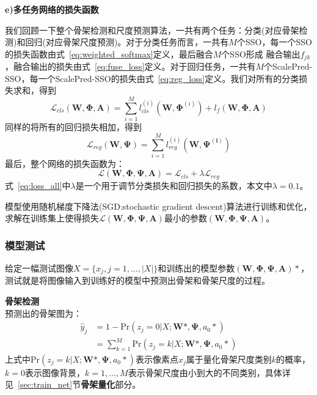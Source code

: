 \documentclass[UTF8]{ctexart}
\numberwithin{equation}{section} %
\numberwithin{table}{section} %
\begin{document}
\vspace{1em}
\noindent \textbf{e)多任务网络的损失函数}

我们回顾一下整个骨架检测和尺度预测算法，一共有两个任务：分类(对应骨架检测)和回归(对应骨架尺度预测)。对于分类任务而言，一共有$M$个SSO，每一个SSO的损失函数由式~\ref{eq:weighted_softmax}定义，最后融合$M$个SSO形成
融合输出$f_{jk}$，融合输出的损失由式~\ref{eq:fuse_loss}定义。对于回归任务，一共有$M$个ScalePred-SSO，每一个ScalePred-SSO的损失由式~\ref{eq:reg_loss}定义。我们对所有的分类损失求和，得到
\begin{equation}
\mathcal{L}_{cls}(\mathbf{W},\mathbf{\Phi},\mathbf{A}) = \sum_{i=1}^M l^{(i)}_{cls}(\mathbf{W}, \mathbf{\Phi}^{(i)})+l_{f}(\mathbf{W},\mathbf{\Phi},\mathbf{A})
\label{eq:cls_loss_all}
\end{equation}
同样的将所有的回归损失相加，得到
\begin{equation}
\mathcal{L}_{reg}(\mathbf{W},\mathbf{\Psi}) = \sum_{i=1}^M l_{reg}^{(i)}(\mathbf{W},\mathbf{\Psi^{(i)}})
\label{eq:reg_loss_all}
\end{equation}
最后，整个网络的损失函数为：
\begin{equation}
\mathcal{L}(\mathbf{W},\mathbf{\Phi},\mathbf{\Psi},\mathbf{A}) =\mathcal{L}_{cls} + \lambda \mathcal{L}_{reg}
\label{eq:loss_all}
\end{equation}
式~\ref{eq:loss_all}中$\lambda$是一个用于调节分类损失和回归损失的系数，本文中$\lambda=0.1$。

模型使用随机梯度下降法(SGD:stochastic gradient descent)算法进行训练和优化，求解在训练集上使得损失$\mathcal{L}(\mathbf{W},\mathbf{\Phi},\mathbf{\Psi},\mathbf{A})$最小的参数$(\mathbf{W},\mathbf{\Phi},\mathbf{\Psi},\mathbf{A})$。

\subsubsection{模型测试}
给定一幅测试图像$X=\big\{x_j,j=1,...,|X|\big\}$和训练出的模型参数$(\mathbf{W},\mathbf{\Phi},\mathbf{\Psi},\mathbf{A})*$，测试就是将图像输入到训练好的模型中预测出骨架和骨架尺度的过程。

\vspace{1em}
\noindent \textbf{骨架检测}\\
预测出的骨架图为：
\begin{equation}
\begin{split}
\hat{y}_j &= 1 - \text{Pr}(z_j=0|X;\mathbf{W}*, \mathbf{\Psi}, a_0*)\\
          &= \sum_{k=1}^M \text{Pr}(z_j=k|X;\mathbf{W}*, \mathbf{\Psi}, a_0*)
\end{split}
\label{eq:get_sk}
\end{equation}
上式中$\text{Pr}(z_j=k|X;\mathbf{W}*, \mathbf{\Psi}, a_0*)$表示像素点$x_j$属于量化骨架尺度类别$k$的概率，$k=0$表示图像背景，$k=1,...,M$表示骨架尺度由小到大的不同类别，具体详见~\ref{sec:train_net}节\textbf{骨架量化}部分。
\end{document}

